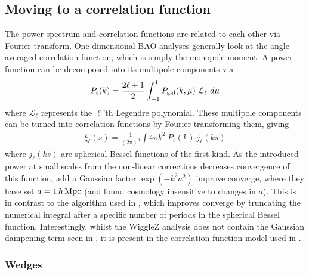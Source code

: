 \documentclass[titlesmallcaps, examinerscopy, copyrightpage]{uqthesis}
\begin{document}
\subsection{Moving to a correlation function} \label{sec:prior:cor}

The power spectrum and correlation functions are related to each other via Fourier transform. One dimensional BAO analyses generally look at the angle-averaged correlation function, which is simply the monopole moment. A power function can be decomposed into its multipole components via 
\begin{align}
P_{\ell}(k) = \frac{2\ell + 1}{2} \int_{-1}^1 P_{\rm{gal}}(k, \mu) \ \mathcal{L}_\ell \  d\mu
\end{align}
where $\mathcal{L}_\ell$ represents the $\ell$'th Legendre polynomial. These multipole components can be turned into correlation functions by Fourier transforming them, giving
\begin{align}
\xi_\ell(s) = \frac{1}{(2\pi)^3} \int 4\pi k^2 \ P_\ell(k) \ j_\ell(ks)
\end{align}
where $j_\ell(ks)$ are spherical Bessel functions of the first kind. As the introduced power at small scales from the non-linear corrections decreases convergence of this function,  \citet{AndersonAubourg2012} add a Gaussian factor $\exp(-k^2 a^2)$ improve converge, where they have set $a= 1\, h\, \rm{Mpc}$ (and found cosmology insensitive to changes in $a$). This is in contrast to the algorithm used in \citet{BlakeDavis2011}, which improves converge by truncating the numerical integral after a specific number of periods in the spherical Bessel function. Interestingly, whilst the \citet{BlakeDavis2011} WiggleZ analysis does not contain the Gaussian dampening term seen in \citet{AndersonAubourg2012}, it is present in the correlation function model used in \citet{BlakeKazin2011}.

\subsubsection{Wedges} \label{sec:prior:cor:wedge}
\end{document}
